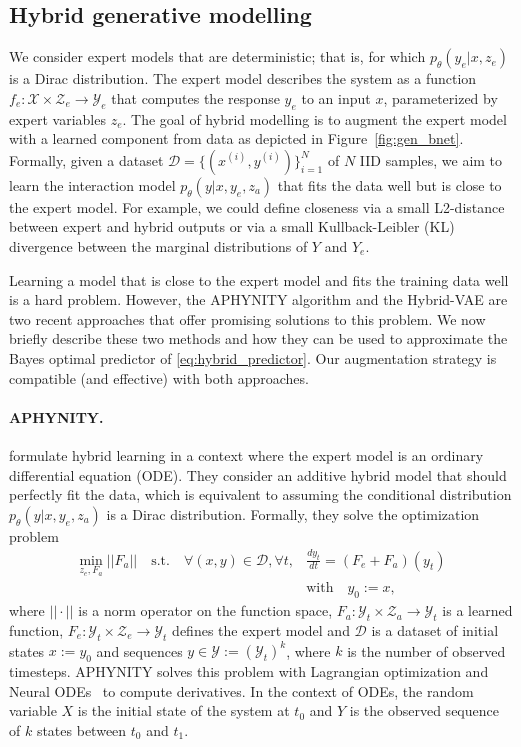 \documentclass{article}
\newcommand\figref{Figure~\ref}
\begin{document}
\subsection{Hybrid generative modelling}
We consider expert models that are deterministic; that is, for which $p_\theta(y_e|x, z_e)$ is a Dirac distribution. The expert model describes the system as a function $f_e : \mathcal{X} \times \mathcal{Z}_e \rightarrow \mathcal{Y}_e$ that computes the response $y_e$ to an input $x$, parameterized by expert variables $z_e$. The goal of hybrid modelling is to augment the expert model with a learned component from data as depicted in \figref{fig:gen_bnet}. Formally, given a dataset $\mathcal{D} = \{(x^{(i)}, y^{(i)})\}_{i=1}^N$ of $N$ IID samples, we aim to learn the interaction model $p_\theta(y|x, y_e, z_a)$ that fits the data well but is close to the expert model. For example, we could define closeness via a small L2-distance between expert and hybrid outputs or via a small Kullback-Leibler (KL) divergence between the marginal distributions of $Y$ and $Y_e$.

Learning a model that is close to the expert model and fits the training data well is a hard problem. However, the APHYNITY algorithm \citep{APHYNITY} and the Hybrid-VAE \citep[][HVAE]{HVAE} are two recent approaches that offer promising solutions to this problem. We now briefly describe these two methods and how they can be used to approximate the Bayes optimal predictor of \eqref{eq:hybrid_predictor}. Our augmentation strategy is compatible (and effective) with both approaches.
\paragraph{APHYNITY.}
\citet{APHYNITY} formulate hybrid learning in a context where the expert model is an ordinary differential equation (ODE). They consider an additive hybrid model that should perfectly fit the data, which is equivalent to assuming the conditional distribution $p_\theta(y|x, y_e, z_a)$ is a Dirac distribution. Formally, they solve the optimization problem
\begin{align}
    \min_{z_e, F_a} ||F_a|| \quad \text{s.t.} \quad \forall (x, y) \in \mathcal{D}, \forall t,& \frac{dy_t}{dt} = (F_e + F_a)(y_t) \nonumber \\ &\text{with} \quad y_0 := x, \label{eq:APHYNITY}
\end{align}
where $||\cdot||$ is a norm operator on the function space, $F_a: \mathcal{Y}_t \times \mathcal{Z}_a \rightarrow \mathcal{Y}_t$ is a learned function, $F_e: \mathcal{Y}_t \times \mathcal{Z}_e \rightarrow \mathcal{Y}_t$ defines the expert model and $\mathcal{D}$ is a dataset of initial states $x:=y_0$ and sequences $y \in \mathcal{Y} := (\mathcal{Y}_t)^k$, where $k$ is the number of observed timesteps. APHYNITY solves this problem with Lagrangian optimization and Neural ODEs~\citep{NODE} to compute derivatives. In the context of ODEs, the random variable $X$ is the initial state of the system at $t_0$ and $Y$ is the observed sequence of $k$ states between $t_0$ and $t_1$.
\end{document}
